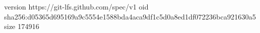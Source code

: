 version https://git-lfs.github.com/spec/v1
oid sha256:d05365d695169a9c5554e1588bda4aca9df1c5d0a8ed1df072236bca921630a5
size 174916
